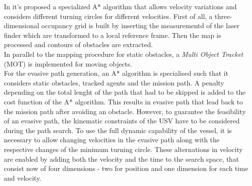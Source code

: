 \documentclass[journal]{IEEEtran}
\begin{document}
              \indent In \cite{Blaich2015} it's proposed a specialized A* algorithm that allows velocity variations and considers different turning circles for different velocities. First of all, a three-dimensional occupancy grid is built by inserting the measurementd of the laser finder which are transformed to a local reference frame. Then the map is processed and contours of obstacles are extracted.\\
              In parallel to the mapping procedure for static obstacles, a \textit{Multi Object Tracket} (MOT) is implemented for moving objects.\\
              For the evasive path generation, an A* algorithm is specialised such that it considers static obstacles, tracked agents and the mission path. A penalty depending on the total lenght of the path that had to be skipped is added to the cost function of the A* algorithm. This results in evasive path that lead back to the mission path after avoiding an obstacle. However, to guarantee the feasibility of an evasive path, the kinematic constraints of the USV have to be considered during the path search. To use the full dynamic capability of the vessel, it is necessary to allow changing velocities in the evasive path along with the respective changes of the minimum turning circle. These alternations in velocity are enabled by adding both the velocity and the time to the search space, that consist now of four dimensions - two for position and one dimension for each time and velocity.\\
\end{document}
